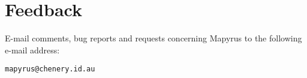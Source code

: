 
\section{Feedback}

E-mail comments, bug reports and requests concerning Mapyrus to
the following e-mail address:

\begin{verbatim}
mapyrus@chenery.id.au
\end{verbatim}

